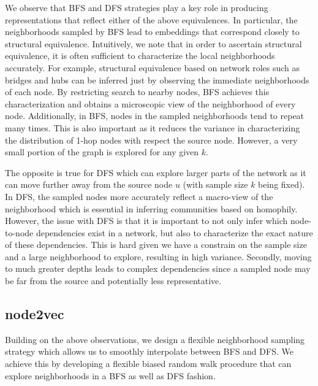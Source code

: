 We observe that BFS and DFS strategies play a key role in producing representations that reflect either of the above equivalences. In particular, the neighborhoods sampled by BFS lead to embeddings that correspond closely to structural equivalence. Intuitively, we note that in order to ascertain structural equivalence, it is often sufficient to characterize the local neighborhoods accurately. For example, structural equivalence based on network roles such as bridges and hubs can be inferred just by observing the immediate neighborhoods of each node. By restricting search to nearby nodes, BFS achieves this characterization and obtains a microscopic view of the neighborhood of every node. Additionally, in BFS, nodes in the sampled neighborhoods tend to repeat many times. This is also important as it reduces the variance in characterizing the distribution of 1-hop nodes with respect the source node. However, a very small portion of the graph is explored for any given $k$.

The opposite is true for DFS which can explore larger parts of the network as it can move further away from the source node $u$ (with sample size $k$ being fixed). In DFS, the sampled nodes more accurately reflect a macro-view of the neighborhood which is essential in inferring communities based on homophily. However, the issue with DFS is that it is important to not only infer which node-to-node dependencies exist in a network, but also to characterize the exact nature of these dependencies. This is hard given we have a constrain on the sample size and a large neighborhood to explore, resulting in high variance. Secondly, moving to much greater depths leads to complex dependencies since a sampled node may be far from the source and potentially less representative. 

\subsection{node2vec}

Building on the above observations, we design a flexible neighborhood sampling strategy which allows us to smoothly interpolate between BFS and DFS. We achieve this by developing a flexible biased random walk procedure that can explore neighborhoods in a BFS as well as DFS fashion.

